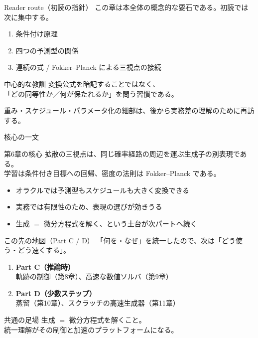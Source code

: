 \asmain
\begin{frame}{Reader route（初読の指針）}
    この章は本全体の概念的な要石である。初読では次に集中する。
    \begin{enumerate}
        \item 条件付け原理
        \item 四つの予測型の関係
        \item 連続の式 / Fokker--Planck による三視点の接続
    \end{enumerate}
    \begin{block}{中心的な教訓}
        変換公式を暗記することではなく、\\
        「どの同等性か／何が保たれるか」を問う習慣である。
    \end{block}
    \vfill
    \footnotesize
    重み・スケジュール・パラメータ化の細部は、後から実務差の理解のために再訪する。
\end{frame}
\asmain
\begin{frame}{核心の一文}
    \begin{block}{第6章の核心}
        拡散の三視点は、同じ確率経路の周辺を運ぶ生成子の別表現である。\\
        学習は条件付き目標への回帰、密度の法則は Fokker--Planck である。
    \end{block}
    \begin{itemize}
        \item オラクルでは予測型もスケジュールも大きく変換できる
        \item 実務では有限性のため、表現の選びが効きうる
        \item 生成 $=$ 微分方程式を解く、という土台が次パートへ続く
    \end{itemize}
\end{frame}
\asmain
\begin{frame}{この先の地図（Part C / D）}
    「何を・なぜ」を統一したので、次は「どう使う・どう速くする」。
    \begin{enumerate}
        \item \textbf{Part C（推論時）}\\
        軌跡の制御（第8章）、高速な数値ソルバ（第9章）
        \item \textbf{Part D（少数ステップ）}\\
        蒸留（第10章）、スクラッチの高速生成器（第11章）
    \end{enumerate}
    \begin{exampleblock}{共通の足場}
        生成 $=$ 微分方程式を解くこと。\\
        統一理解がその制御と加速のプラットフォームになる。
    \end{exampleblock}
\end{frame}
